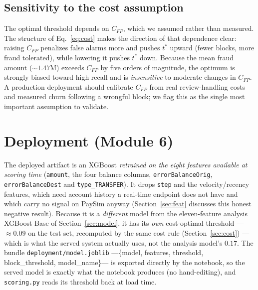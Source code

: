 \documentclass{article}
\begin{document}
\subsection{Sensitivity to the cost assumption}
\label{subsec:sensitivity}
The optimal threshold depends on $C_{FP}$, which we assumed rather than
measured. The structure of Eq.~\ref{eq:cost} makes the direction of
that dependence clear: raising $C_{FP}$ penalizes false alarms more and
pushes $t^{*}$ upward (fewer blocks, more fraud tolerated), while
lowering it pushes $t^{*}$ down. Because the mean fraud amount
($\sim$$1.47$M) exceeds $C_{FP}$ by five orders of magnitude, the
optimum is strongly biased toward high recall and is \emph{insensitive}
to moderate changes in $C_{FP}$. A production deployment should
calibrate $C_{FP}$ from real review-handling costs and measured churn
following a wrongful block; we flag this as the single most important
assumption to validate.

\section{Deployment (Module 6)}
\label{sec:deployment}

The deployed artifact is an XGBoost \emph{retrained on the eight
features available at scoring time} (\texttt{amount}, the four balance
columns, \texttt{errorBalanceOrig}, \texttt{errorBalanceDest} and
\texttt{type\_TRANSFER}). It drops \texttt{step} and the velocity/recency
features, which need account history a real-time endpoint does not have and
which carry no signal on PaySim anyway (Section~\ref{sec:feat} discusses
this honest negative result). Because it is a \emph{different} model from the
eleven-feature analysis XGBoost Base of Section~\ref{sec:model}, it has its
\emph{own} cost-optimal threshold --- $\approx 0.09$ on the test set, recomputed
by the same cost rule (Section~\ref{sec:cost}) --- which is what the served
system actually uses, not the analysis model's $0.17$. The bundle
\texttt{deployment/model.joblib} ---\{model, features, threshold,
block\_threshold, model\_name\}--- is exported directly by the notebook, so
the served model is exactly what the notebook produces (no hand-editing), and
\texttt{scoring.py} reads its threshold back at load time.
\end{document}
